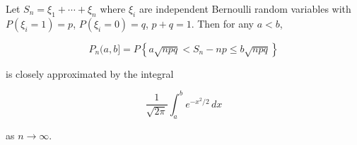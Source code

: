 Let $S_n = \xi_1 + \cdots + \xi_n$ where $\xi_i$ are independent Bernoulli random variables with $P(\xi_i = 1) = p$, $P(\xi_i = 0) = q$, $p + q = 1$. Then for any $a < b$,

$$P_n(a, b] = P\left\{a\sqrt{npq} < S_n - np \leq b\sqrt{npq}\right\}$$

is closely approximated by the integral

$$\frac{1}{\sqrt{2\pi}} \int_a^b e^{-x^2/2} \, dx$$

as $n \to \infty$.
